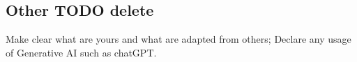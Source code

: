 %
%

\subsection{Other TODO delete}

Make clear what are yours and what are adapted from others;
Declare any usage of Generative AI such as chatGPT.
